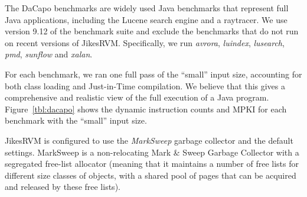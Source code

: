 \begin{table}
\begin{center}
%
\end{center}
\caption{Dynamic instruction counts and MPKI for the DaCapo benchmarks with the ``small'' input size}
\label{tbl:dacapo}
\end{table}

The DaCapo benchmarks are widely used Java benchmarks that represent full Java
applications, including the Lucene search engine and a raytracer. We use
version 9.12 of the benchmark suite and exclude the benchmarks that do not run
on recent versions of JikesRVM. Specifically, we run \emph{avrora},
\emph{luindex}, \emph{lusearch}, \emph{pmd}, \emph{sunflow} and \emph{xalan}.

For each benchmark, we ran one full pass of the ``small'' input size,
accounting for both class loading and Just-in-Time compilation. We believe that
this gives a comprehensive and realistic view of the full execution of a Java
program. Figure~\ref{tbl:dacapo} shows the dynamic instruction counts and MPKI
for each benchmark with the ``small'' input size.

JikesRVM is configured to use the \emph{MarkSweep} garbage collector and the
default settings. MarkSweep is a non-relocating Mark \& Sweep Garbage Collector
with a segregated free-list allocator (meaning that it maintains a number of
free lists for different size classes of objects, with a shared pool of pages
that can be acquired and released by these free lists).
